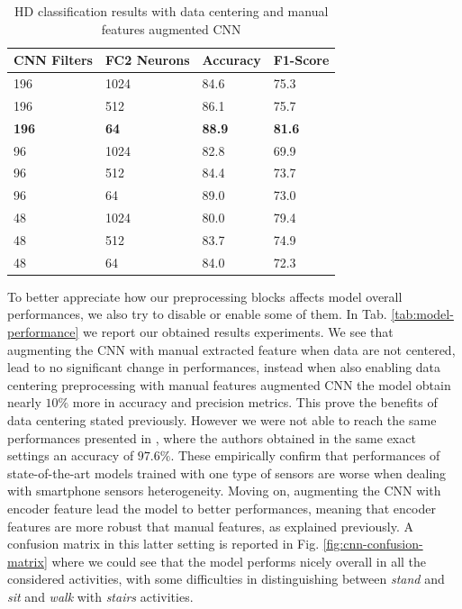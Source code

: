 \begin{table}[b]
	\centering
		\begin{tabular}{ p{1.8cm}p{1.9cm}p{1.7cm}p{1.7cm} }
			\hline
			CNN Filters & FC2 Neurons & Accuracy & F1-Score \\
			\hline
			196 & 1024 & 84.6 & 75.3 \\
			196 & 512 & 86.1 & 75.7 \\
			\textbf{196} & \textbf{64} & \textbf{88.9} & \textbf{81.6} \\
			96 & 1024 & 82.8 & 69.9 \\
			96 & 512 & 84.4 & 73.7 \\
			96 & 64 & 89.0 & 73.0 \\
			48 & 1024 & 80.0 & 79.4 \\
			48 & 512 & 83.7 & 74.9 \\
			48 & 64 & 84.0 & 72.3 \\
			\hline
		\end{tabular}
		\caption{HD classification results with data centering and manual features augmented CNN}
		\label{tab:model-selection}
\end{table}
To better appreciate how our preprocessing blocks affects model overall performances, we also try to disable or enable some of them. In Tab. \ref{tab:model-performance} we report our obtained results experiments. We see that augmenting the CNN with manual extracted feature when data are not centered, lead to no significant change in performances, instead when also enabling data centering preprocessing with manual features augmented CNN the model obtain nearly $10\%$ more in accuracy and precision metrics. This prove the benefits of data centering stated previously. However we were not able to reach the same performances presented in \cite{ignatov2018real}, where the authors obtained in the same exact settings an accuracy of $97.6\%$. These empirically confirm that performances of state-of-the-art models trained with one type of sensors are worse when dealing with smartphone sensors heterogeneity. Moving on, augmenting the CNN with encoder feature lead the model to better performances, meaning that encoder features are more robust that manual features, as explained previously. A confusion matrix in this latter setting is reported in Fig. \ref{fig:cnn-confusion-matrix} where we could see that the model performs nicely overall in all the considered activities, with some difficulties in distinguishing between \textit{stand} and \textit{sit} and \textit{walk} with \textit{stairs} activities.

